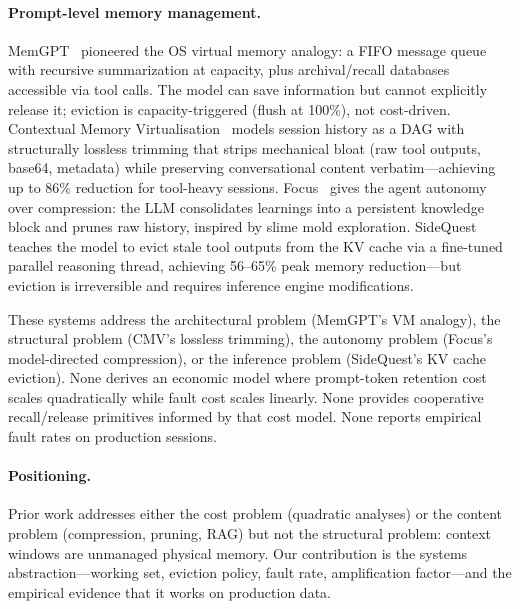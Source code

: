 \paragraph{Prompt-level memory management.}
MemGPT~\citep{packer2023memgpt} pioneered the OS virtual memory
analogy: a FIFO message queue with recursive summarization at
capacity, plus archival/recall databases accessible via tool calls.
The model can save information but cannot explicitly release it;
eviction is capacity-triggered (flush at 100\%), not cost-driven.
Contextual Memory Virtualisation~\citep{cmv2026} models session
history as a DAG with structurally lossless trimming that strips
mechanical bloat (raw tool outputs, base64, metadata) while
preserving conversational content verbatim---achieving up to 86\%
reduction for tool-heavy sessions. Focus~\citep{verma2026focus}
gives the agent autonomy over compression: the LLM consolidates
learnings into a persistent knowledge block and prunes raw history,
inspired by slime mold exploration. SideQuest~\citep{sidequest2026}
teaches the model to evict stale tool outputs from the KV cache via
a fine-tuned parallel reasoning thread, achieving 56--65\% peak
memory reduction---but eviction is irreversible and requires
inference engine modifications.

These systems address the architectural problem (MemGPT's VM
analogy), the structural problem (CMV's lossless trimming), the
autonomy problem (Focus's model-directed compression), or the
inference problem (SideQuest's KV cache eviction). None derives an
economic model where prompt-token retention cost scales quadratically
while fault cost scales linearly. None provides cooperative
recall/release primitives informed by that cost model. None reports
empirical fault rates on production sessions.

\paragraph{Positioning.}
Prior work addresses either the cost problem (quadratic analyses) or
the content problem (compression, pruning, RAG) but not the
structural problem: context windows are unmanaged physical memory.
Our contribution is the systems abstraction---working set, eviction
policy, fault rate, amplification factor---and the empirical evidence
that it works on production data.

